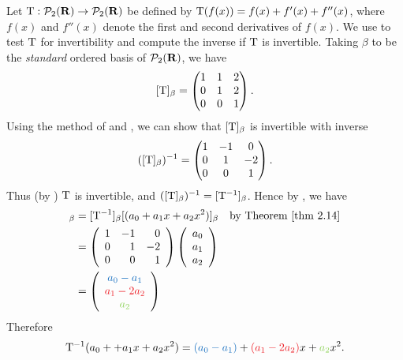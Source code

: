 \begin{example} \label{example 3.2.7}
Let \(\mathrm{T}: \mathcal{P}_2(\mathbf{R}) \to \mathcal{P}_2(\mathbf{R})\) be defined by \(\mathrm{T}(f(x)) = f(x) + f'(x) + f''(x)\),
where \(f(x)\) and \(f''(x)\) denote the first and second derivatives of \(f(x)\).
We use  to test \(\mathrm{T}\) for invertibility and compute the inverse if \(\mathrm{T}\) is invertible.
Taking \(\beta\) to be the \emph{standard} ordered basis of \(\mathcal{P}_2(\mathbf{R})\), we have
\[
    [\mathrm{T}]_{\beta} = \begin{pmatrix}
        1 & 1 & 2 \\ 0 & 1 & 2 \\ 0 & 0 & 1
    \end{pmatrix}.
\]
Using the method of  and , we can show that \([\mathrm{T}]_{\beta}\) is invertible with inverse
\[
    ([\mathrm{T}]_{\beta})^{-1} = \begin{pmatrix}
        1 & -1 & 0 \\ 0 & 1 & -2 \\ 0 & 0 & 1
    \end{pmatrix}.
\]
Thus (by ) \(\mathrm{T}\) is invertible, and \(([\mathrm{T}]_{\beta})^{-1} = [\mathrm{T}^{-1}]_{\beta}\).
Hence by , we have
\begin{align*}
    [\T^{-1}(a_0 + a_1 x + a_2 x^2)]_{\beta}
        & = [\T^{-1}]_{\beta} [(a_0 + a_1 x + a_2 x^2)]_{\beta} & \text{by \THM{2.14}} \\
        & = \left(\begin{array}{rrr}
                1 & -1 & 0 \\
                0 & 1 & -2 \\
                0 & 0 & 1
            \end{array}\right)
            \left(\begin{array}{l}
                a_0 \\ a_1 \\ a_2
            \end{array}\right) \\
        & = \left(\begin{array}{c}
                \BLUE{a_0 - a_1} \\ \RED{a_1 - 2 a_2} \\ \GREEN{a_2}
            \end{array}\right)
\end{align*}
Therefore
\[
    \T^{-1}(a_0 + + a_1 x + a_2 x^2) = \BLUE{(a_0 - a_1)} + \RED{(a_1 - 2 a_2)} x + \GREEN{a_2} x^2.
\]
\end{example}
